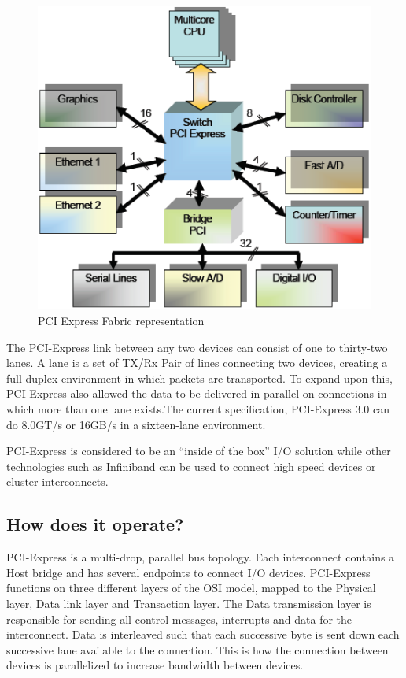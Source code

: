\documentclass[conference]{IEEEtran}
\begin{document}
\begin{figure}[!t]
	\begin{center}
		\includegraphics[scale=.6]{pciFabric}
	\end{center}
	\caption{PCI Express Fabric representation}
	\label{fig:pci:fabric}
\end{figure}

The PCI-Express link between any two devices can consist of one to thirty-two
lanes. A lane is a set of TX/Rx Pair of lines connecting two devices, creating
a full duplex environment in which packets are transported. To expand upon this,
PCI-Express also allowed the data to be delivered in parallel on connections in
which more than one lane exists.The current specification, PCI-Express 3.0 can
do 8.0GT/s or 16GB/s in a sixteen-lane environment. 

PCI-Express is considered to be an ``inside of the box'' I/O solution while
other technologies such as Infiniband can be used to connect high speed devices
or cluster interconnects.

\subsection{How does it operate?}
\label{sub:pci:oper}
PCI-Express is a multi-drop, parallel bus topology. Each interconnect contains a
Host bridge and has several endpoints to connect I/O
devices\cite{bhatt2003creating}. PCI-Express functions on three different layers
of the OSI model, mapped to the Physical layer, Data link layer and Transaction
layer. The Data transmission layer is responsible for sending all control
messages, interrupts and data for the interconnect. Data is interleaved such
that each successive byte is sent down each successive lane available to the
connection. This is how the connection between devices is parallelized to
increase bandwidth between devices. 
\end{document}
